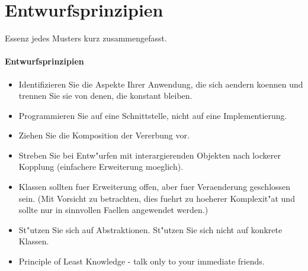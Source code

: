 \section{Entwurfsprinzipien}
Essenz jedes Musters kurz zusammengefasst. 

\paragraph{Entwurfsprinzipien}

\begin{itemize}[leftmargin=0.2in]
	\item Identifizieren Sie die Aspekte Ihrer Anwendung, die sich aendern koennen und trennen Sie sie 
  von denen, die konstant bleiben.
	\item Programmieren Sie auf eine Schnittstelle, nicht auf eine Implementierung.
	\item Ziehen Sie die Komposition der Vererbung vor.
	\item Streben Sie bei Entw"urfen mit interargierenden Objekten nach lockerer Kopplung (einfachere 
Erweiterung moeglich).
	\item Klassen sollten fuer Erweiterung offen, aber fuer Veraenderung geschlossen sein. (Mit Vorsicht zu 
betrachten, dies fuehrt zu hoeherer Komplexit"at und sollte nur in sinnvollen Faellen 
angewendet werden.)
	\item St"utzen Sie sich auf Abstraktionen. St"utzen Sie sich nicht auf konkrete Klassen.  
	\item Principle of Least Knowledge - talk only to your immediate friends.
\end{itemize}
